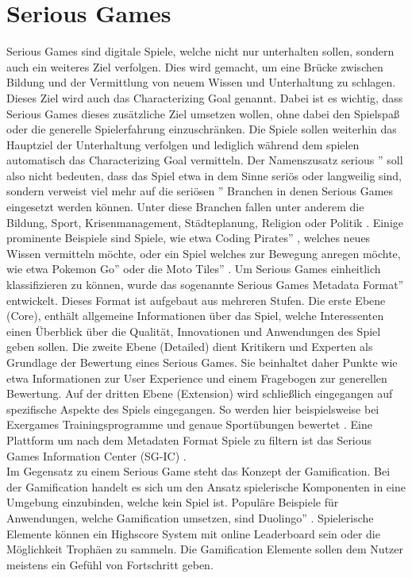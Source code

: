 \section{Serious Games}
Serious Games sind digitale Spiele, welche nicht nur unterhalten sollen, sondern auch ein weiteres Ziel verfolgen. Dies wird gemacht, um eine Brücke zwischen Bildung und der Vermittlung von neuem Wissen und Unterhaltung zu schlagen. Dieses Ziel wird auch das Characterizing Goal genannt. Dabei ist es wichtig, dass Serious Games dieses zusätzliche Ziel umsetzen wollen, ohne dabei den Spielspaß oder die generelle Spielerfahrung einzuschränken. Die Spiele sollen weiterhin das Hauptziel der Unterhaltung verfolgen und lediglich während dem spielen automatisch das Characterizing Goal vermitteln. Der Namenszusatz \glqq serious '' soll also nicht bedeuten, dass das Spiel etwa in dem Sinne seriös oder langweilig sind, sondern verweist viel mehr auf die \glqq seriösen '' Branchen in denen Serious Games eingesetzt werden können. Unter diese Branchen fallen unter anderem die Bildung, Sport, Krisenmanagement, Städteplanung, Religion oder Politik \cite{seriousgames_gaia} . 
Einige prominente Beispiele sind Spiele, wie etwa \glqq Coding Pirates'' \cite{coding_game}, welches neues Wissen vermitteln möchte, oder ein Spiel welches zur Bewegung anregen möchte, wie etwa \glqq Pokemon Go''\cite{althoff2016influence} oder die \glqq Moto Tiles'' \cite{liu2018playful}. Um Serious Games einheitlich klassifizieren zu können, wurde das sogenannte \glqq Serious Games Metadata Format'' entwickelt. Dieses Format ist aufgebaut aus mehreren Stufen. Die erste Ebene (Core), enthält allgemeine Informationen über das Spiel, welche Interessenten einen Überblick über die Qualität, Innovationen und Anwendungen des Spiel geben sollen. Die zweite Ebene (Detailed) dient Kritikern und Experten als Grundlage der Bewertung eines Serious Games. Sie beinhaltet daher Punkte wie etwa Informationen zur User Experience und einem Fragebogen zur generellen Bewertung. Auf der dritten Ebene (Extension) wird schließlich eingegangen auf spezifische Aspekte des Spiels eingegangen. So werden hier beispielsweise bei Exergames Trainingsprogramme und genaue Sportübungen bewertet \cite{gobel2011makes}. Eine Plattform um nach dem Metadaten Format Spiele zu filtern ist das Serious Games Information Center (SG-IC) \cite{sg_ic}. \\
Im Gegensatz zu einem Serious Game steht das Konzept der Gamification. Bei der Gamification handelt es sich um den Ansatz spielerische Komponenten in eine Umgebung einzubinden, welche kein Spiel ist. Populäre Beispiele für Anwendungen, welche Gamification umsetzen, sind \glqq Duolingo'' \cite{duolingo}. Spielerische Elemente können ein Highscore System mit online Leaderboard sein oder die Möglichkeit Trophäen zu sammeln. Die Gamification Elemente sollen dem Nutzer meistens ein Gefühl von Fortschritt geben. 

